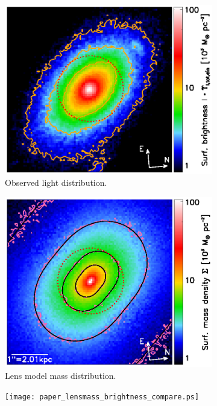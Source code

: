 \documentclass[useAMS,usenatbib]{mnras}
\begin{document}
\begin{figure}
\centering
\begin{subfigure}{.3\textwidth}
  \centering
  \includegraphics[width=.9\linewidth]{lens_surface_brightness.ps}
  \caption{Observed light distribution.}
  \label{fig:lenscomparelight}
\end{subfigure}%
\begin{subfigure}{.3\textwidth}
  \centering
  \includegraphics[width=.9\linewidth]{lens_surface_density.ps}
  \caption{Lens model mass distribution.}
  \label{fig:lenscomparemass}
\end{subfigure}
\begin{subfigure}{.3\textwidth}
  \centering
  \texttt{[image: paper\_lensmass\_brightness\_compare.ps]}

\end{subfigure}
\end{figure}
\end{document}
